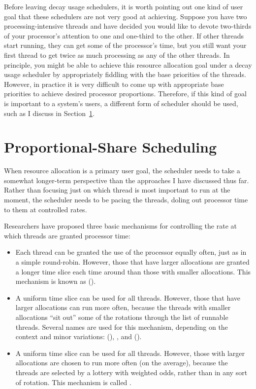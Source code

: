 Before leaving decay usage schedulers, it is worth pointing out one
kind of user goal that these schedulers are not very good at
achieving.  Suppose you have two processing-intensive threads and
have decided you would like to devote two-thirds of your processor's
attention to one and one-third to the other.  If other threads start
running, they can get some of the processor's time, but you still want
your first thread to get twice as much processing as any of the other
threads.  In principle, you might be able to achieve this resource
allocation goal under a decay usage scheduler by appropriately
fiddling with the base priorities of the threads.  However, in
practice it is very difficult to come up with appropriate base
priorities to achieve desired processor proportions.  Therefore, if
this kind of goal is important to a system's users, a different form
of scheduler should be used, such as I discuss in Section~\ref{proportional-share-scheduling-section}.

\section{Proportional-Share Scheduling}\label{proportional-share-scheduling-section}
When resource allocation is a primary user goal, the scheduler needs
to take a somewhat longer-term perspective than the approaches I have
discussed thus far.  Rather than focusing just on which thread is most
important to run at the moment, the scheduler needs to be pacing the
threads, doling out processor time to them at controlled rates.

Researchers have proposed three basic mechanisms for controlling the
rate at which threads are granted processor time:
\begin{itemize}
\item
Each thread can be granted the use of the processor equally often,
just as in a simple round-robin. However, those that have larger
allocations are granted a longer time slice each time around than
those with smaller allocations.  This mechanism is known as  ().
\item
A uniform time slice can be used for all threads.  However, those that
have larger allocations can run more often, because the threads with
smaller allocations ``sit out'' some of the rotations through the list
of runnable threads.  Several names are used for this mechanism, depending
on the context and minor variations:  (),
, and  ().
\item
A uniform time slice can be used for all threads.  However, those with
larger allocations are chosen to run more often (on the average),
because the threads are selected by a lottery with weighted odds,
rather than in any sort of rotation.  This mechanism is called .
\end{itemize}


